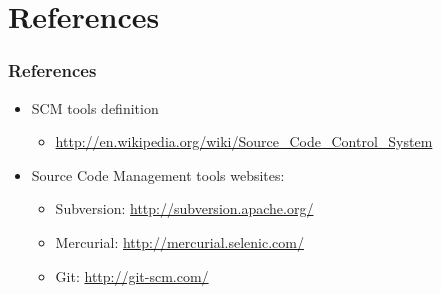 \documentclass{beamer}
\begin{document}
\section{References}

\begin{frame} 
\frametitle{References}

\begin{itemize}

\item SCM tools definition
        \begin{itemize}
	\item \tiny{\url{http://en.wikipedia.org/wiki/Source\_Code\_Control\_System}}
        \end{itemize}

\item Source Code Management tools websites:

        \begin{itemize}
        \item Subversion: \small{\url{http://subversion.apache.org/}}
        \item Mercurial: \small{\url{http://mercurial.selenic.com/}}
        \item Git: \small{\url{http://git-scm.com/}}
        \end{itemize}

\end{itemize}

\end{frame}



\end{document}

